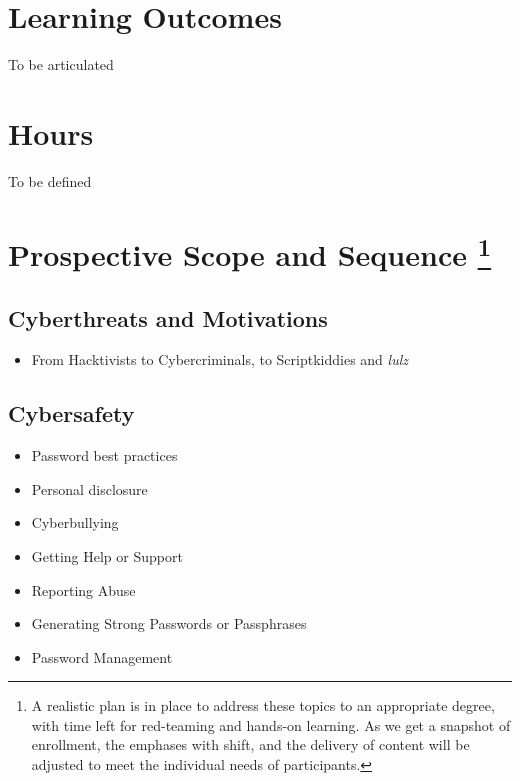 \documentclass[letterpaper,10pt,english]{sphinxmanual}
\begin{document}
\section{Learning Outcomes}
\label{cybersecurity:learning-outcomes}
To be articulated


\section{Hours}
\label{cybersecurity:hours}
To be defined


\section{Prospective Scope and Sequence \footnote{
A realistic plan is in place to address these topics to an appropriate degree, with time left for red-teaming and hands-on learning. As we get a snapshot of enrollment, the emphases with shift, and the delivery of content will be adjusted to meet the individual needs of participants.
}}
\label{cybersecurity:prospective-scope-and-sequence-2}

\subsection{Cyberthreats and Motivations}
\label{cybersecurity:cyberthreats-and-motivations}\begin{itemize}
\item {} 
From Hacktivists to Cybercriminals, to Scriptkiddies and \emph{lulz}

\end{itemize}


\subsection{Cybersafety}
\label{cybersecurity:cybersafety}\begin{itemize}
\item {} 
Password best practices

\item {} 
Personal disclosure

\item {} 
Cyberbullying

\item {} 
Getting Help or Support

\item {} 
Reporting Abuse

\item {} 
Generating Strong Passwords or Passphrases

\item {} 
Password Management

\end{itemize}
\end{document}
